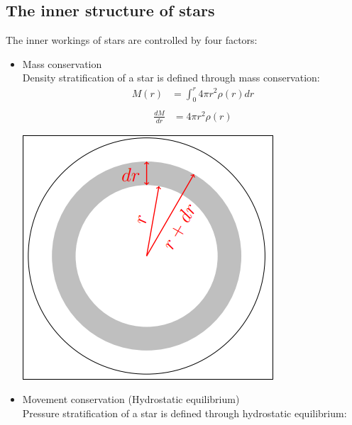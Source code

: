 \documentclass[11pt,a4paper]{article}
\begin{document}
\subsection{The inner structure of stars}
The inner workings of stars are controlled by four factors: 
\begin{itemize}
\item Mass conservation \\
    Density stratification of a star is defined through mass conservation:
    \begin{align*}
        M(r) &= \int_0^r 4 \pi r^2 \rho (r) dr \\
    \end{align*}
    \begin{align*}
        \frac {dM}{dr} &= 4 \pi r^2 \rho (r)  
    \end{align*}
    \begin{center}
        \includegraphics[width=0.3\linewidth]{screenshot_2024-01-21-174522.png}
    \end{center}
\item Movement conservation (Hydrostatic equilibrium) \\
    Pressure stratification of a star is defined through hydrostatic equilibrium:


\end{itemize}
\end{document}
